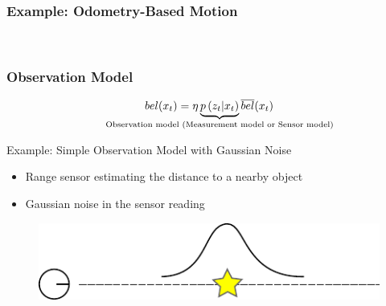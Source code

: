 \begin{frame}
    \frametitle{Example: Odometry-Based Motion}
    
    \begin{figure}[!h]
        \centering
        \\
    \end{figure}
    
\end{frame}
    
\begin{frame}
    \frametitle{Observation Model}
    \begin{equation*}
    bel(\state_{t}) = \eta \underbrace{p\left(\observation_{t} |\state_{t} \right)}_{\text{\makebox[0pt]{Observation model (Measurement model or Sensor model)}}} \overline{bel}(\state_{t})
    \end{equation*}
\end{frame}
    
\begin{frame}{Example: Simple Observation Model with Gaussian Noise}
    
    \begin{itemize}
        \item Range sensor estimating the distance to a nearby object
        \item Gaussian noise in the sensor reading
    \end{itemize} 
    
    \begin{figure}[!h]
        \includegraphics[width=0.6\columnwidth]{./images/simple_observation_model.pdf}
    \end{figure}    
\end{frame}